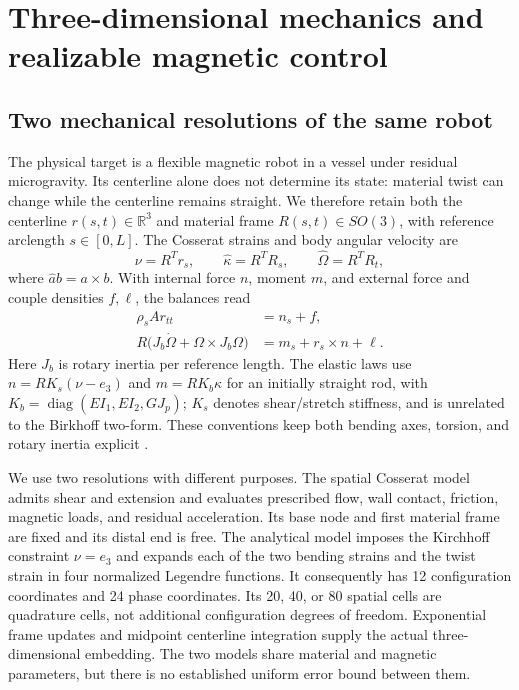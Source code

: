\section{Three-dimensional mechanics and realizable magnetic control}
\label{sec:model-control}

\subsection{Two mechanical resolutions of the same robot}
The physical target is a flexible magnetic robot in a vessel under residual microgravity. Its centerline alone does not determine its state: material twist can change while the centerline remains straight. We therefore retain both the centerline $r(s,t)\in\mathbb R^3$ and material frame $R(s,t)\in SO(3)$, with reference arclength $s\in[0,L]$. The Cosserat strains and body angular velocity are
\begin{equation}
 \nu=R^Tr_s,\qquad \widehat\kappa=R^TR_s,\qquad
 \widehat\Omega=R^TR_t,
 \label{eq:rod-kinematics}
\end{equation}
where $\widehat a b=a\times b$. With internal force $n$, moment $m$, and external force and couple densities $f,\ell$, the balances read
\begin{equation}
\begin{aligned}
 \rho_s A r_{tt}&=n_s+f,\\
 R\bigl(J_b\dot\Omega+\Omega\times J_b\Omega\bigr)
 &=m_s+r_s\times n+\ell.
\end{aligned}
 \label{eq:rod-balance}
\end{equation}
Here $J_b$ is rotary inertia per reference length. The elastic laws use
$n=RK_s(\nu-e_3)$ and $m=RK_b\kappa$ for an initially straight rod, with
$K_b=\operatorname{diag}(EI_1,EI_2,GJ_p)$; $K_s$ denotes shear/stretch stiffness, and is unrelated to the Birkhoff two-form. These conventions keep both bending axes, torsion, and rotary inertia explicit \citep{Antman2005,Gazzola2018}.

We use two resolutions with different purposes. The spatial Cosserat model admits shear and extension and evaluates prescribed flow, wall contact, friction, magnetic loads, and residual acceleration. Its base node and first material frame are fixed and its distal end is free. The analytical model imposes the Kirchhoff constraint $\nu=e_3$ and expands each of the two bending strains and the twist strain in four normalized Legendre functions. It consequently has 12 configuration coordinates and 24 phase coordinates. Its 20, 40, or 80 spatial cells are quadrature cells, not additional configuration degrees of freedom. Exponential frame updates and midpoint centerline integration supply the actual three-dimensional embedding. The two models share material and magnetic parameters, but there is no established uniform error bound between them.


